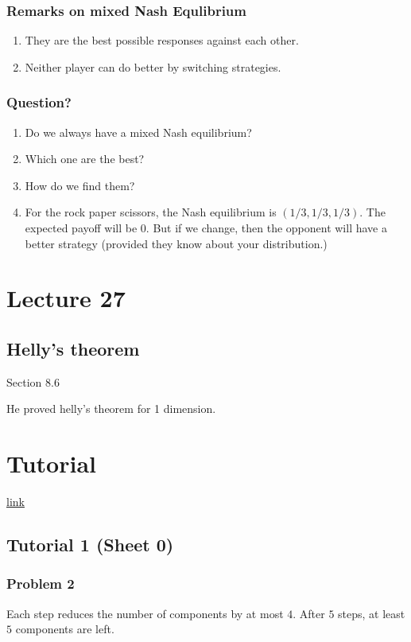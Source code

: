 \documentclass[11pt]{article}
\begin{document}
\subsubsection{Remarks on mixed Nash Equlibrium}
\label{sec:org7c31bdf}
\begin{enumerate}
\item They are the best possible responses against each other.
\item Neither player can do better by switching strategies.
\end{enumerate}
\subsubsection{Question?}
\label{sec:orgb1d0c1f}
\begin{enumerate}
\item Do we always have a mixed Nash equilibrium?
\item Which one are the best?
\item How do we find them?
\item For the rock paper scissors, the Nash equilibrium is \((1/3, 1/3, 1/3)\).
The expected payoff will be \(0\). But if we change, then the opponent will
have a better strategy (provided they know about your distribution.)
\end{enumerate}
\section{Lecture 27}
\label{sec:org1ae883a}
\subsection{Helly's theorem}
\label{sec:org784835a}
Section 8.6

He proved helly's theorem for 1 dimension.
\section{Tutorial}
\label{sec:org8e87310}
\href{http://discretemath.imp.fu-berlin.de/DMII-2018-19/}{link}
\subsection{Tutorial 1 (Sheet 0)}
\label{sec:org646c8d2}
\subsubsection{Problem 2}
\label{sec:org309020e}
Each step reduces the number of components by at most \(4\). After \(5\) steps, at least \(5\) components are left.
\end{document}
